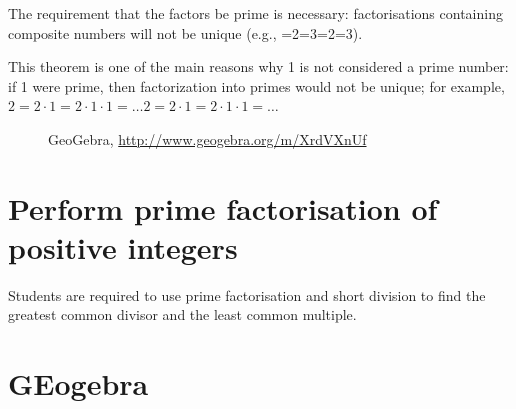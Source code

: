 The requirement that the factors be prime is necessary: factorisations containing composite numbers will not be unique (e.g., {=2=3}{=2=3}).

This theorem is one of the main reasons why 1 is not considered a prime number: if 1 were prime, then factorization into primes would not be unique; for example, ${\displaystyle 2=2\cdot 1=2\cdot 1\cdot 1=\ldots }{\displaystyle 2=2\cdot 1=2\cdot 1\cdot 1=\ldots }$


\begin{figure}[H]
\begin{center}
\caption*{GeoGebra, \url{http://www.geogebra.org/m/XrdVXnUf}}
\end{center}
\end{figure}



\newpage
\section{Perform prime factorisation of positive integers}
Students are required to use prime
factorisation and short division to find the
greatest common divisor and the least
common multiple.
\section{GEogebra}
